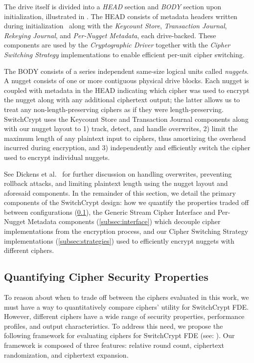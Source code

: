 The drive itself is divided into a \emph{HEAD} section and \emph{BODY} section
upon initialization, illustrated in . The HEAD consists of
metadata headers written during initialization~\cite{StrongBox} along with the
\emph{Keycount Store}, \emph{Transaction Journal}, \emph{Rekeying Journal}, and
\emph{Per-Nugget Metadata}, each drive-backed. These components are used by the
\emph{Cryptographic Driver} together with the \emph{Cipher Switching Strategy}
implementations to enable efficient per-unit cipher switching.

The BODY consists of a series independent same-size logical units called
\emph{nuggets}. A nugget consists of one or more contiguous physical drive
blocks. Each nugget is coupled with metadata in the HEAD indicating which cipher
was used to encrypt the nugget along with any additional ciphertext output; the
latter allows us to treat any non-length-preserving ciphers as if they were
length-preserving. SwitchCrypt uses the Keycount Store and Transaction Journal
components along with our nugget layout to 1) track, detect, and handle
overwrites, 2) limit the maximum length of any plaintext input to ciphers, thus
amortizing the overhead incurred during encryption, and 3) independently and
efficiently switch the cipher used to encrypt individual nuggets.

See Dickens et al.~\cite{StrongBox} for further discussion on handling
overwrites, preventing rollback attacks, and limiting plaintext length using the
nugget layout and aforesaid components. In the remainder of this section, we
detail the primary components of the SwitchCrypt design: how we quantify the
properties traded off between configurations (\cref{subsec:quantify}), the
Generic Stream Cipher Interface and Per-Nugget Metadata components
(\cref{subsec:interface}) which decouple cipher implementations from the
encryption process, and our Cipher Switching Strategy implementations
(\cref{subsec:strategies}) used to efficiently encrypt nuggets with different
ciphers.

\subsection{Quantifying Cipher Security Properties} \label{subsec:quantify}

To reason about when to trade off between the ciphers evaluated in this work, we
must have a way to quantitatively compare ciphers' utility for SwitchCrypt FDE.
However, different ciphers have a wide range of security properties, performance
profiles, and output characteristics. To address this need, we propose the
following framework for evaluating ciphers for SwitchCrypt FDE (see:
). Our framework is composed of three features: relative
round count, ciphertext randomization, and ciphertext expansion.

